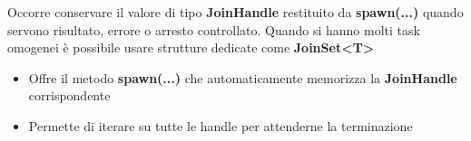 Occorre conservare il valore di tipo \textbf{JoinHandle} restituito da \textbf{spawn(...)} quando
servono risultato, errore o arresto controllato.
Quando si hanno molti task omogenei è possibile usare strutture dedicate come
\textbf{JoinSet<T>}

\begin{itemize}
  \item Offre il metodo \textbf{spawn(...)} che automaticamente memorizza la \textbf{JoinHandle} corrispondente
  \item Permette di iterare su tutte le handle per attenderne la terminazione
\end{itemize}










